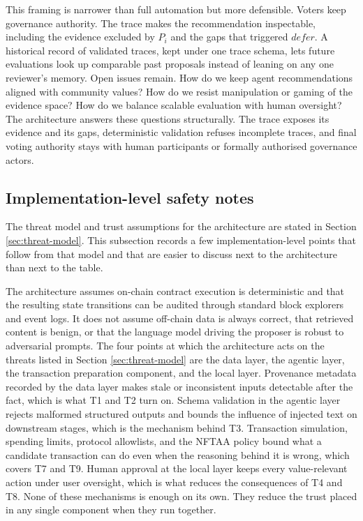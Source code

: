 This framing is narrower than full automation but more defensible. Voters keep governance authority. The trace makes the recommendation inspectable, including the evidence excluded by $P_i$ and the gaps that triggered $\textit{defer}$. A historical record of validated traces, kept under one trace schema, lets future evaluations look up comparable past proposals instead of leaning on any one reviewer's memory. Open issues remain. How do we keep agent recommendations aligned with community values? How do we resist manipulation or gaming of the evidence space? How do we balance scalable evaluation with human oversight? The architecture answers these questions structurally. The trace exposes its evidence and its gaps, deterministic validation refuses incomplete traces, and final voting authority stays with human participants or formally authorised governance actors.



\subsection{Implementation-level safety notes}
\label{sec:impl-safety-notes}

The threat model and trust assumptions for the architecture are stated in Section \ref{sec:threat-model}. This subsection records a few implementation-level points that follow from that model and that are easier to discuss next to the architecture than next to the table.

The architecture assumes on-chain contract execution is deterministic and that the resulting state transitions can be audited through standard block explorers and event logs. It does not assume off-chain data is always correct, that retrieved content is benign, or that the language model driving the proposer is robust to adversarial prompts. The four points at which the architecture acts on the threats listed in Section \ref{sec:threat-model} are the data layer, the agentic layer, the transaction preparation component, and the local layer. Provenance metadata recorded by the data layer makes stale or inconsistent inputs detectable after the fact, which is what T1 and T2 turn on. Schema validation in the agentic layer rejects malformed structured outputs and bounds the influence of injected text on downstream stages, which is the mechanism behind T3. Transaction simulation, spending limits, protocol allowlists, and the NFTAA policy bound what a candidate transaction can do even when the reasoning behind it is wrong, which covers T7 and T9. Human approval at the local layer keeps every value-relevant action under user oversight, which is what reduces the consequences of T4 and T8. None of these mechanisms is enough on its own. They reduce the trust placed in any single component when they run together.

